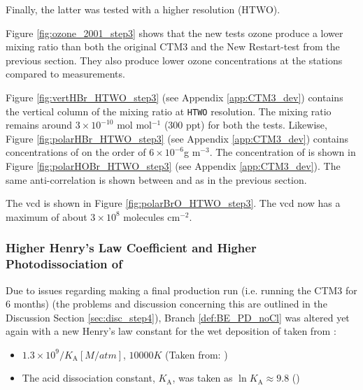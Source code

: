 Finally, the latter was tested with a higher resolution (HTWO). 

\medskip

Figure \ref{fig:ozone_2001_step3} shows that the new tests ozone produce a lower mixing ratio than both the original CTM3 and the New Restart-test from the previous section. They also produce lower ozone concentrations at the stations compared to measurements. 





\medskip

Figure \ref{fig:vertHBr_HTWO_step3} (see Appendix \ref{app:CTM3_dev}) contains the vertical column of the  mixing ratio at \texttt{HTWO} resolution. The mixing ratio remains around $3\times10^{-10}$ mol mol$^{-1}$ (300 ppt) for both the tests. Likewise, Figure \ref{fig:polarHBr_HTWO_step3} (see Appendix \ref{app:CTM3_dev}) contains concentrations of  on the order of $6\times10^{-6} $g m$^{-3}$. The concentration of  is shown in Figure \ref{fig:polarHOBr_HTWO_step3} (see Appendix \ref{app:CTM3_dev}). The same anti-correlation is shown between  and  as in the previous section. 

\medskip

The  \acrshort{vcd} is shown in Figure \ref{fig:polarBrO_HTWO_step3}. The  \acrshort{vcd} now has a maximum of about $3\times10^8$ molecules cm$^{-2}$. 

\subsubsection{Higher Henry's Law Coefficient and Higher Photodissociation of }\label{sec:res_step4}

Due to issues regarding making a final production run (i.e. running the CTM3 for 6 months) (the problems and discussion concerning this are outlined in the Discussion Section \ref{sec:disc_step4}), Branch \ref{def:BE_PD_noCl} was altered yet again with a new Henry's law constant for the wet deposition of  taken from \cite{Sander99}: 

\begin{itemize}
    \item $1.3\times10^9/K_\text{A} [M/atm]$, $10 000 K$ (Taken from: \cite{Brimblecombe1988TheSA})
    \item The acid dissociation constant, $K_\text{A}$, was taken as $\ln{K_\text{A}} \approx 9.8$ (\cite{Levanov})
\end{itemize}

